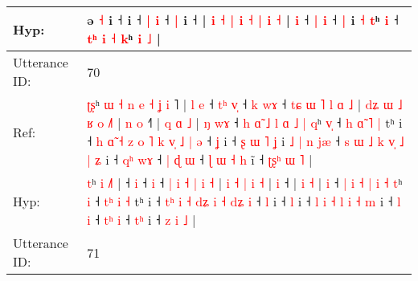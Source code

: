 \documentclass[10pt]{article}
\DeclareRobustCommand{\hl}[1]{{\textcolor{red}{#1}}}
\begin{document}
\begin{longtable}{ll}
 \\
Hyp: & \hl{}\hl{}\hl{}\hl{}\hl{}\hl{}\hl{}\hl{}\hl{}\hl{}\hl{}\hl{}\hl{}\hl{}\hl{}\hl{}\hl{}\hl{}\hl{}\hl{}\hl{}\hl{}\hl{}\hl{}\hl{}ə\hl{}\hl{} \hl{˧} i\hl{}\hl{}\hl{}\hl{}\hl{}\hl{}\hl{}\hl{} ˧\hl{}\hl{} i ˧ \hl{|} \hl{i} ˧ \hl{|} i ˧ |\hl{}\hl{} \hl{i} \hl{˧} \hl{|} \hl{i} \hl{˧} \hl{}\hl{}\hl{|} \hl{i} \hl{˧} |\hl{}\hl{}\hl{}\hl{} \hl{i} ˧ \hl{|} \hl{i} ˧ \hl{|} i\hl{}\hl{} \hl{˧} \hl{}\hl{t}ʰ \hl{i} ˧ \hl{}\hl{t}\hl{ʰ} \hl{i} \hl{˧} \hl{k}ʰ \hl{}\hl{i} \hl{˩} |
 \\
\midrule
Utterance ID: & 70 \\
Ref: & \hl{ʈ}\hl{ʂ}ʰ\hl{ }\hl{ɯ}\hl{ }\hl{˧}\hl{ }\hl{n}\hl{ }\hl{e}\hl{ }\hl{˧} \hl{ʝ} \hl{i}\hl{ }˥ |\hl{ }\hl{l}\hl{ }\hl{e} ˧\hl{ }\hl{t}\hl{ʰ} \hl{v}\hl{̩} ˧\hl{ }\hl{k} \hl{w}\hl{ɤ} ˧ \hl{t}\hl{ɕ} \hl{ɯ} \hl{˥} \hl{l} \hl{ɑ} \hl{˩} |\hl{ }\hl{d}\hl{ʑ} \hl{ɯ} \hl{˩} \hl{ʁ} \hl{o} \hl{˩}\hl{˥} |\hl{ }\hl{n} \hl{o} ˧\hl{˥} |\hl{ }\hl{q} \hl{ɑ} \hl{˩} |\hl{ }\hl{ŋ} \hl{w}\hl{ɤ} ˧\hl{ }\hl{h} \hl{ɑ}\hl{̃} \hl{˩} \hl{l} \hl{ɑ} \hl{˩} \hl{|} \hl{q}ʰ \hl{v}\hl{̩} ˧\hl{ }\hl{h} \hl{ɑ}\hl{̃} \hl{˥} \hl{|} tʰ i ˧\hl{ }\hl{h} \hl{ɑ}\hl{̃} \hl{˧} \hl{z} \hl{o}\hl{ }\hl{˥} \hl{k} \hl{v}\hl{̩} \hl{˩}\hl{ }\hl{|} \hl{ə} ˧ \hl{ʝ} i ˧\hl{ }\hl{ʂ}\hl{ }\hl{ɯ}\hl{ }\hl{˥} \hl{ʝ} i\hl{ }\hl{˩}\hl{ }\hl{|}\hl{ }\hl{n}\hl{ }\hl{j}\hl{æ} ˧\hl{ }\hl{s} \hl{ɯ} \hl{˩} \hl{k} \hl{v}\hl{̩} \hl{˩} \hl{|} \hl{ʑ} i ˧ \hl{q}\hl{ʰ} \hl{w}\hl{ɤ} ˧ \hl{|}\hl{ }\hl{ɖ} \hl{ɯ} ˧\hl{ }\hl{ɭ}\hl{ }\hl{ɯ} \hl{˧}\hl{ }\hl{h} i\hl{̃} ˧ \hl{ʈ}\hl{ʂ}\hl{ʰ} \hl{ɯ} \hl{˥} |
 \\
Hyp: & \hl{}\hl{t}ʰ\hl{}\hl{}\hl{}\hl{}\hl{}\hl{}\hl{}\hl{}\hl{}\hl{} \hl{i} \hl{}\hl{˩}˥ |\hl{}\hl{}\hl{}\hl{} ˧\hl{}\hl{}\hl{} \hl{}\hl{i} ˧\hl{}\hl{} \hl{}\hl{i} ˧ \hl{}\hl{|} \hl{i} \hl{˧} \hl{|} \hl{i} \hl{˧} |\hl{}\hl{}\hl{} \hl{i} \hl{˧} \hl{|} \hl{i} \hl{}\hl{˧} |\hl{}\hl{} \hl{i} ˧\hl{} |\hl{}\hl{} \hl{i} \hl{˧} |\hl{}\hl{} \hl{}\hl{i} ˧\hl{}\hl{} \hl{}\hl{|} \hl{i} \hl{˧} \hl{|} \hl{i} \hl{˧} \hl{t}ʰ \hl{}\hl{i} ˧\hl{}\hl{} \hl{t}\hl{ʰ} \hl{i} \hl{˧} tʰ i ˧\hl{}\hl{} \hl{t}\hl{ʰ} \hl{i} \hl{˧} \hl{}\hl{d}\hl{ʑ} \hl{i} \hl{}\hl{˧} \hl{}\hl{d}\hl{ʑ} \hl{i} ˧ \hl{l} i ˧\hl{}\hl{}\hl{}\hl{}\hl{}\hl{} \hl{l} i\hl{}\hl{}\hl{}\hl{}\hl{}\hl{}\hl{}\hl{}\hl{} ˧\hl{}\hl{} \hl{l} \hl{i} \hl{˧} \hl{}\hl{l} \hl{i} \hl{˧} \hl{m} i ˧ \hl{}\hl{l} \hl{}\hl{i} ˧ \hl{}\hl{t}\hl{ʰ} \hl{i} ˧\hl{}\hl{}\hl{}\hl{} \hl{}\hl{t}\hl{ʰ} i\hl{} ˧ \hl{}\hl{}\hl{z} \hl{i} \hl{˩} |
 \\
\midrule
Utterance ID: & 71 \\

\end{longtable}
\end{document}
